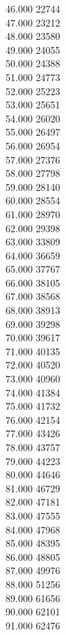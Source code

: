 { 46.000	22744 \\
 47.000	23212 \\
 48.000	23580 \\
 49.000	24055 \\
 50.000	24388 \\
 51.000	24773 \\
 52.000	25223 \\
 53.000	25651 \\
 54.000	26020 \\
 55.000	26497 \\
 56.000	26954 \\
 57.000	27376 \\
 58.000	27798 \\
 59.000	28140 \\
 60.000	28554 \\
 61.000	28970 \\
 62.000	29398 \\
 63.000	33809 \\
 64.000	36659 \\
 65.000	37767 \\
 66.000	38105 \\
 67.000	38568 \\
 68.000	38913 \\
 69.000	39298 \\
 70.000	39617 \\
 71.000	40135 \\
 72.000	40520 \\
 73.000	40960 \\
 74.000	41384 \\
 75.000	41732 \\
 76.000	42154 \\
 77.000	43426 \\
 78.000	43757 \\
 79.000	44223 \\
 80.000	44646 \\
 81.000	46729 \\
 82.000	47181 \\
 83.000	47555 \\
 84.000	47968 \\
 85.000	48395 \\
 86.000	48805 \\
 87.000	49976 \\
 88.000	51256 \\
 89.000	61656 \\
 90.000	62101 \\
 91.000	62476 \\
}

